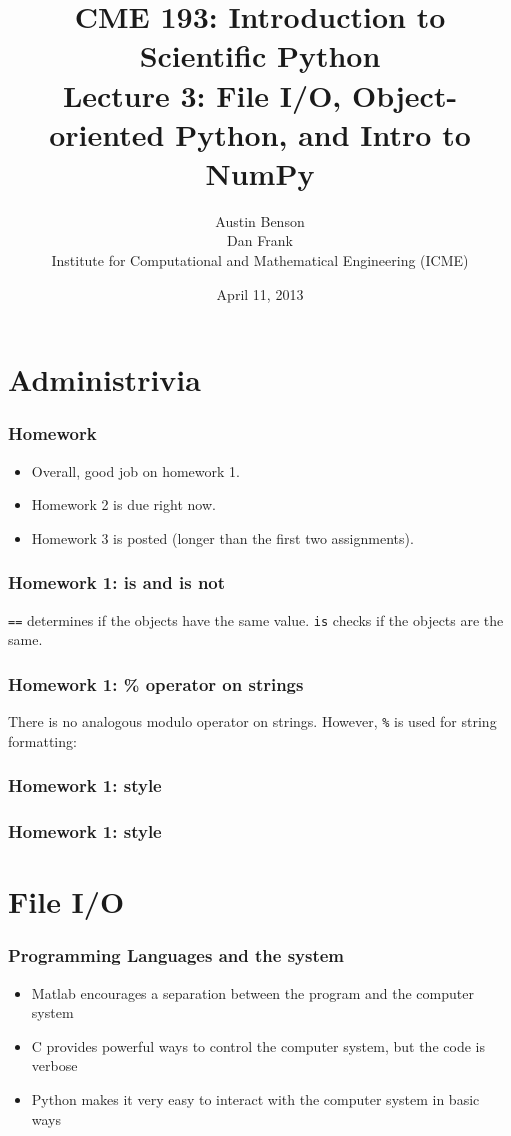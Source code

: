 \documentclass{beamer}
\title{CME 193: Introduction to Scientific Python \\
Lecture 3: File I/O, Object-oriented Python, and Intro to NumPy}
\author{Austin Benson \\
\vspace{0.1in}
Dan Frank \\
\vspace{0.1in}
Institute for Computational and Mathematical Engineering (ICME)}
\date{April 11, 2013}
\begin{document}
\maketitle

\section{Administrivia}
\begin{frame}
\frametitle{Homework}
\begin{itemize}
\setlength{\itemsep}{0.1in}
\item{Overall, good job on homework 1.}
\item{Homework 2 is due right now.}
\item{Homework 3 is posted (longer than the first two assignments).}
\end{itemize}
\end{frame}

\begin{frame}
\frametitle{Homework 1: is and is not}
\texttt{==} determines if the objects have the same value.  \texttt{is} checks if the objects are the same.
\end{frame}

\begin{frame}
\frametitle{Homework 1: \% operator on strings}
There is no analogous modulo operator on strings.  However, \texttt{\%} is used for string formatting:
\end{frame}

\begin{frame}
\frametitle{Homework 1: style}
\end{frame}

\begin{frame}
\frametitle{Homework 1: style}
\end{frame}

\section{File I/O}
\begin{frame}
\frametitle{Programming Languages and the system}
\begin{itemize}
\setlength{\itemsep}{0.1in}
\item{Matlab encourages a separation between the program and the computer system}
\item{C provides powerful ways to control the computer system, but the code is verbose}
\item{Python makes it very easy to interact with the computer system in basic ways}
\end{itemize}
\end{frame}
\end{document}
